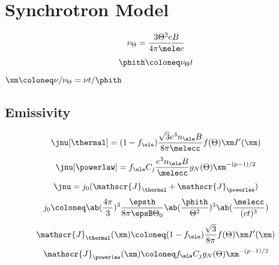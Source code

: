 \section{Synchrotron Model}
\begin{equation}
  \nu_{\Theta}
  =
  \frac{3\Theta^2 eB}{4\pi \mele c}
\end{equation}
\begin{equation}
  \phith
  \coloneq
  \nu_{\Theta}t
\end{equation}
\(\xm \coloneq \nu/\nu_{\Theta} = \nu t/\phith\)
\subsection{Emissivity}
\begin{equation}
  \jnu[\thermal]
  =
  (1-f_{\ele})
  \frac{\sqrt{3}e^3 n_{\ele}B}{8\pi \melecc}
  f(\Theta)
  \xm
  I'(\xm)
\end{equation}
\begin{equation}
  \jnu[\powerlaw]
  =
  f_{\ele}
  C_j
  \frac{e^3 n_{\ele}B}{\melecc}
  g_N(\Theta)
  \xm^{-(p-1)/2}
\end{equation}
\begin{equation}
  \jnu
  =
  j_0
  (
    \mathscr{J}_{\thermal}
    +
    \mathscr{J}_{\powerlaw}
  )
\end{equation}
\begin{equation}
  j_0
  \coloneq
  \ab(\frac{4\pi}{3})^3
  \frac{\epsth}{8\pi\epsB\Theta_0}
  \ab(\frac{\phith}{\Theta^2})^3
  \ab(\frac{\melecc}{(ct)^3})
\end{equation}
\begin{equation}
  \mathscr{J}_{\thermal}(\xm)
  \coloneq
  (1-f_{\ele})
  \frac{\sqrt{3}}{8\pi}
  f(\Theta)
  \xm
  I'(\xm)
\end{equation}
\begin{equation}
  \mathscr{J}_{\powerlaw}(\xm)
  \coloneq
  f_{\ele}
  C_{j}
  g_N(\Theta)\xm^{-(p-1)/2}
\end{equation}
